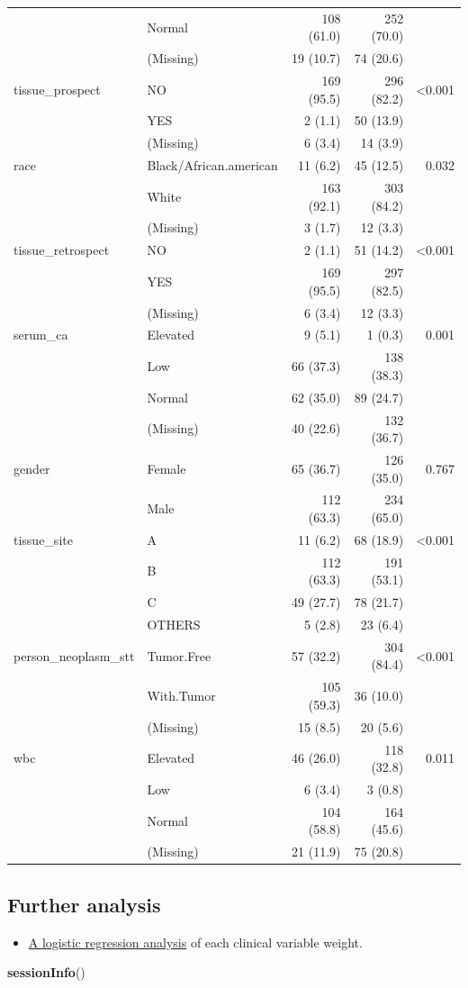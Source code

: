 \documentclass[]{article}
\newenvironment{Shaded}{\begin{snugshade}}{\end{snugshade}}
\newcommand{\KeywordTok}[1]{\textcolor[rgb]{0.13,0.29,0.53}{\textbf{#1}}}
\newcommand{\NormalTok}[1]{#1}
\providecommand{\tightlist}{%
  \setlength{\itemsep}{0pt}\setlength{\parskip}{0pt}}
\begin{document}
\begin{longtable}[]{@{}llrrr@{}}
& Normal & 108 (61.0) & 252 (70.0) &\tabularnewline
& (Missing) & 19 (10.7) & 74 (20.6) &\tabularnewline
tissue\_prospect & NO & 169 (95.5) & 296 (82.2) &
\textless{}0.001\tabularnewline
& YES & 2 (1.1) & 50 (13.9) &\tabularnewline
& (Missing) & 6 (3.4) & 14 (3.9) &\tabularnewline
race & Black/African.american & 11 (6.2) & 45 (12.5) &
0.032\tabularnewline
& White & 163 (92.1) & 303 (84.2) &\tabularnewline
& (Missing) & 3 (1.7) & 12 (3.3) &\tabularnewline
tissue\_retrospect & NO & 2 (1.1) & 51 (14.2) &
\textless{}0.001\tabularnewline
& YES & 169 (95.5) & 297 (82.5) &\tabularnewline
& (Missing) & 6 (3.4) & 12 (3.3) &\tabularnewline
serum\_ca & Elevated & 9 (5.1) & 1 (0.3) & 0.001\tabularnewline
& Low & 66 (37.3) & 138 (38.3) &\tabularnewline
& Normal & 62 (35.0) & 89 (24.7) &\tabularnewline
& (Missing) & 40 (22.6) & 132 (36.7) &\tabularnewline
gender & Female & 65 (36.7) & 126 (35.0) & 0.767\tabularnewline
& Male & 112 (63.3) & 234 (65.0) &\tabularnewline
tissue\_site & A & 11 (6.2) & 68 (18.9) &
\textless{}0.001\tabularnewline
& B & 112 (63.3) & 191 (53.1) &\tabularnewline
& C & 49 (27.7) & 78 (21.7) &\tabularnewline
& OTHERS & 5 (2.8) & 23 (6.4) &\tabularnewline
person\_neoplasm\_stt & Tumor.Free & 57 (32.2) & 304 (84.4) &
\textless{}0.001\tabularnewline
& With.Tumor & 105 (59.3) & 36 (10.0) &\tabularnewline
& (Missing) & 15 (8.5) & 20 (5.6) &\tabularnewline
wbc & Elevated & 46 (26.0) & 118 (32.8) & 0.011\tabularnewline
& Low & 6 (3.4) & 3 (0.8) &\tabularnewline
& Normal & 104 (58.8) & 164 (45.6) &\tabularnewline
& (Missing) & 21 (11.9) & 75 (20.8) &\tabularnewline
\bottomrule
\end{longtable}

\subsection{Further analysis}\label{further-analysis}

\begin{itemize}
\tightlist
\item
  \href{3.logistic_regression.md}{A logistic regression analysis} of
  each clinical variable weight.
\end{itemize}

\begin{Shaded}
\begin{Highlighting}[]
\KeywordTok{sessionInfo}\NormalTok{()}
\end{Highlighting}
\end{Shaded}
\end{document}
